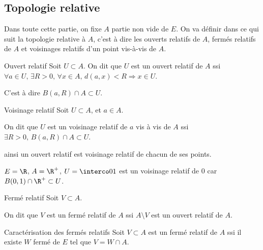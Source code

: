 \subsection{Topologie relative}

Dans toute cette partie, on fixe $A$ partie non vide de $E$.
On va définir dans ce qui suit la topologie relative à $A$, c'est à dire les ouverts relatifs de $A$, fermés relatifs de $A$ et voisinages relatifs d'un point vis-à-vis de $A$.

\begin{definition}{Ouvert relatif}{}
    Soit $U \subset A$. On dit que $U$ est un ouvert relatif de $A$ 
    ssi $\forall a \in U, \, \exists R > 0, \, \forall x \in A, \, d(a, x) < R \Rightarrow x \in U$.

    C'est à dire $B(a, R) \cap A \subset U$.
 
\end{definition}

\begin{definition}{Voisinage relatif}{}
    Soit $U \subset A$, et $a \in A$. 

    On dit que $U$ est un voisinage relatif de $a$ vis à vis de $A$ ssi 
    $\exists R > 0, \, B(a, R) \cap A \subset U$.

    ainsi un ouvert relatif est voisinage relatif de chacun de ses points.
\end{definition}

\begin{exemple}
    $E = \R$, $A = \R^+$, $U = \interco 0 1$ est un voisinage relatif de $0$ 
    car $B(0, 1) \cap \R^+ \subset U$. 
\end{exemple}


\begin{definition}{Fermé relatif}{}
    Soit $V \subset A$. 

    On dit que $V$ est un fermé relatif de $A$ ssi $A \setminus V$ est un ouvert relatif de $A$.
\end{definition}


\begin{proposition}{Caractérisation des fermés relatifs}{}
    Soit $V \subset A$ est un fermé relatif de $A$ ssi il existe $W$ fermé de $E$ tel que $V = W \cap A$.
\end{proposition}


